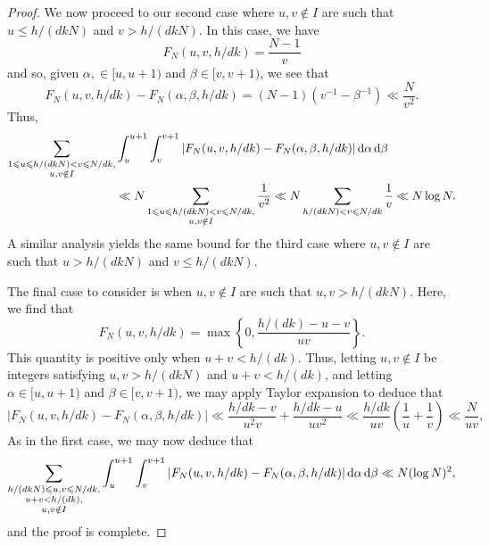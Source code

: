 \documentclass[12pt,reqno]{amsart}
\theoremstyle{definition}
\theoremstyle{remark}
\numberwithin{equation}{section}
\renewcommand{\leq}{\leqslant}
\def\d{{\,{\rm d}}}
\newcommand\1{\mathds{1}}
\begin{document}
\begin{proof}
We now proceed to our second case where $u,v \notin I$ are such that $u \leq h/(dkN)$ and $v > h/(dkN)$. In this case, we have
\[ F_N(u,v,h/dk) = \frac{N-1}{v} \]
and so, given  $\alpha, \in [u,u+1)$ and $\beta \in [v, v+1)$, we see that
\[ F_N(u,v,h/dk) - F_N(\alpha, \beta, h/dk) = (N-1)(v^{-1} - \beta^{-1}) \ll \frac{N}{v^2}. \]
Thus, 
\begin{align*}
\sum_{\substack{1 \leq u \leq h/(dkN) < v \leq N/dk, \\u,v \notin I}   } & \int_u^{u+1} \int_v^{v+1} | F_N(u,v, h/dk) - F_N(\alpha, \beta, h/dk) |  \d \alpha \d \beta  \\
& \ll  N \sum_{\substack{1 \leq u \leq h/(dkN) < v \leq N/dk, \\u,v \notin I}} \frac{1}{v^2} \ll N \sum_{h/(dkN) < v \leq N/dk} \frac{1}{v} \ll N \log N.
\end{align*}
A similar analysis yields the same bound for the third case where $u,v \notin I$ are such that $u > h/(dkN)$ and $v \leq  h/(dkN)$.

The final case to consider is when $u, v \notin I$ are such that $u,v > h/(dkN)$. Here, we find that
\[ F_N(u,v,h/dk)= \max\left\{0, \frac{h/(dk) - u - v}{uv} \right\}. \]
This quantity is positive only when $u + v < h/(dk)$. Thus, letting $u, v \notin I$ be integers satisfying $u, v > h/(dkN)$ and $u + v < h/(dk)$, and letting $\alpha \in [u,u+1)$ and $\beta \in [v,v+1)$, we may apply Taylor expansion to deduce that
\[ |F_N(u,v,h/dk) - F_N(\alpha, \beta, h/dk)| \ll \frac{h/dk - v}{u^2 v} + \frac{h/dk - u}{uv^2} \ll \frac{h/dk}{uv} \left( \frac{1}{u} + \frac{1}{v} \right) \ll  \frac{N}{uv},\]
As in the first case, we may now deduce that
\[  \sum_{\substack{h/(dkN) \leq u, v \leq N/dk, \\ u+ v < h/(dk), \\ u,v \notin I }} \int_{u}^{u+1} \int_v^{v+1} |F_N(u,v,h/dk) - F_N(\alpha, \beta, h/dk)| \d \alpha \d \beta \ll N (\log N)^2,  \]
and the proof is complete.
\end{proof}
\end{document}
